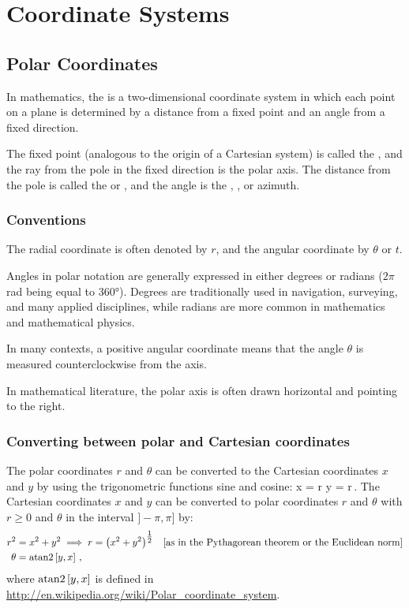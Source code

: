 \section{Coordinate Systems}


\subsection{Polar Coordinates}
In mathematics, the  is a two-dimensional coordinate system in which each point on a plane is determined by a distance from a fixed point and an angle from a fixed direction.

The fixed point (analogous to the origin of a Cartesian system) is called the , and the ray from the pole in the fixed direction is the polar axis. The distance from the pole is called the  or , and the angle is the , , or azimuth.


\subsubsection{Conventions}
The radial coordinate is often denoted by $r$, and the angular coordinate by $\theta$ or $t$.

Angles in polar notation are generally expressed in either degrees or radians ($2\pi$ \si{rad} being equal to \ang{360}). Degrees are traditionally used in navigation, surveying, and many applied disciplines, while radians are more common in mathematics and mathematical physics.

In many contexts, a positive angular coordinate means that the angle $\theta$ is measured counterclockwise from the axis.

In mathematical literature, the polar axis is often drawn horizontal and pointing to the right.


\subsubsection{Converting between polar and Cartesian coordinates}
The polar coordinates $r$ and $\theta$ can be converted to the Cartesian coordinates $x$ and $y$ by using the trigonometric functions sine and cosine:
\beq
x = r\cos\vat\theta\qquad{}\qquad
y = r\sin\vat\theta\,.
\eeq
The Cartesian coordinates $x$ and $y$ can be converted to polar coordinates $r$ and $\theta$ with $r \geq 0$ and $\theta$ in the interval $]-\pi, \pi]$ by:
\begin{align*}
   r^2 &= x^2 + y^2\implies r = \left({x^2 + y^2}\right)^{\tfrac{1}{2}}&\text{[{as in the Pythagorean theorem or the Euclidean norm}]}\\
\theta &= \text{atan2\,}\!\left[{y,x}\right]\,,
\end{align*}
where $\text{atan2\,}\!\left[{y,x}\right]$ is defined in \url{http://en.wikipedia.org/wiki/Polar_coordinate_system}.


